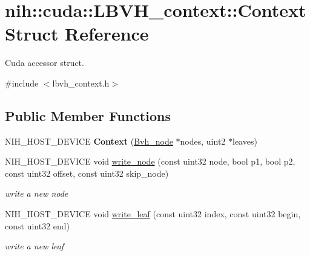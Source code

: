 \hypertarget{structnih_1_1cuda_1_1_l_b_v_h__context_1_1_context}{
\section{nih\-:\-:cuda\-:\-:\-L\-B\-V\-H\-\_\-context\-:\-:\-Context \-Struct \-Reference}
\label{structnih_1_1cuda_1_1_l_b_v_h__context_1_1_context}
}


\-Cuda accessor struct.  




{\ttfamily \#include $<$lbvh\-\_\-context.\-h$>$}

\subsection*{\-Public \-Member \-Functions}
\begin{DoxyCompactItemize}
\item 
\hypertarget{structnih_1_1cuda_1_1_l_b_v_h__context_1_1_context_a48c48237aa069100299b8b8f6d3e351e}{
\-N\-I\-H\-\_\-\-H\-O\-S\-T\-\_\-\-D\-E\-V\-I\-C\-E {\bfseries \-Context} (\hyperlink{structnih_1_1_bvh__node}{\-Bvh\-\_\-node} $\ast$nodes, uint2 $\ast$leaves)}
\label{structnih_1_1cuda_1_1_l_b_v_h__context_1_1_context_a48c48237aa069100299b8b8f6d3e351e}

\item 
\hypertarget{structnih_1_1cuda_1_1_l_b_v_h__context_1_1_context_ae9f7d16e7e03755d3dfcb5ca71a0d1d8}{
\-N\-I\-H\-\_\-\-H\-O\-S\-T\-\_\-\-D\-E\-V\-I\-C\-E void \hyperlink{structnih_1_1cuda_1_1_l_b_v_h__context_1_1_context_ae9f7d16e7e03755d3dfcb5ca71a0d1d8}{write\-\_\-node} (const uint32 node, bool p1, bool p2, const uint32 offset, const uint32 skip\-\_\-node)}
\label{structnih_1_1cuda_1_1_l_b_v_h__context_1_1_context_ae9f7d16e7e03755d3dfcb5ca71a0d1d8}

\begin{DoxyCompactList}\small\item\em write a new node \end{DoxyCompactList}\item 
\hypertarget{structnih_1_1cuda_1_1_l_b_v_h__context_1_1_context_a1a3568a9281f2af0787dfbb641f9b68e}{
\-N\-I\-H\-\_\-\-H\-O\-S\-T\-\_\-\-D\-E\-V\-I\-C\-E void \hyperlink{structnih_1_1cuda_1_1_l_b_v_h__context_1_1_context_a1a3568a9281f2af0787dfbb641f9b68e}{write\-\_\-leaf} (const uint32 index, const uint32 begin, const uint32 end)}
\label{structnih_1_1cuda_1_1_l_b_v_h__context_1_1_context_a1a3568a9281f2af0787dfbb641f9b68e}

\begin{DoxyCompactList}\small\item\em write a new leaf \end{DoxyCompactList}\end{DoxyCompactItemize}
